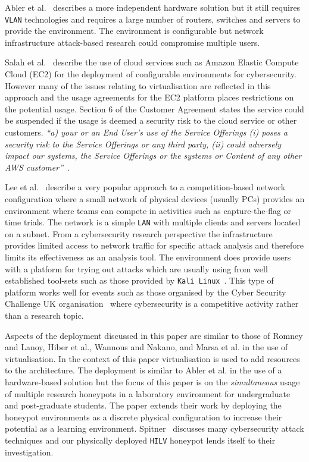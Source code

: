 \documentclass{ieeeaccess}
\begin{document}
Abler et al.~\cite{ACG:06} describes a more independent hardware solution but
it still requires \texttt{VLAN} technologies and requires a large number of
routers, switches and servers to provide the environment. The environment is
configurable but network infrastructure attack-based research could compromise
multiple users.

Salah et al.~\cite{SHZ:15} describe the use of cloud services such as Amazon
Elastic Compute Cloud (EC2) for the deployment of configurable environments for
cybersecurity. However many of the issues relating to virtualisation are
reflected in this approach and the usage agreements for the EC2 platform places
restrictions on the potential usage. Section 6 of the Customer Agreement states
the service could be suspended if the usage is deemed a security risk to the
cloud service or other customers. \textit{``a) your or an End User's use of the
Service Offerings (i) poses a security risk to the Service Offerings or any
third party, (ii) could adversely impact our systems, the Service Offerings or
the systems or Content of any other AWS customer''}~\cite{AWS:18}.

Lee et al.~\cite{LUFC:11} describe a very popular approach to a
competition-based network configuration where a small network of physical
devices (usually PCs) provides an environment where teams can compete in
activities such as capture-the-flag or time trials. The network is a simple
\texttt{LAN} with multiple clients and servers located on a subnet. From a
cybersecurity research perspective the infrastructure provides limited access
to network traffic for specific attack analysis and therefore limits its
effectiveness as an analysis tool. The environment does provide users with a
platform for trying out attacks which are usually using from well established
tool-sets such as those provided by \texttt{Kali Linux}~\cite{OS:17}. This type
of platform works well for events such as those organised by the Cyber Security
Challenge UK organisation~\cite{CSCUK:18} where cybersecurity is a competitive
activity rather than a research topic.   

Aspects of the deployment discussed in this paper are similar to those of
Romney and Lanoy, Hiber et al., Wannous and Nakano, and Marsa et al. in the use
of virtualisation. In the context of this paper virtualisation is used to add
resources to the architecture. The deployment is similar to Abler et al. in the
use of a hardware-based solution but the focus of this paper is on the
\textit{simultaneous} usage of multiple research honeypots in a laboratory
environment for undergraduate and post-graduate students. The paper extends
their work by deploying the honeypot environments as a discrete physical
configuration to increase their potential as a learning environment.
Spitner~\cite{LS:03} discusses many cybersecurity attack techniques and our
physically deployed \texttt{HILV} honeypot lends itself to their investigation. 
\end{document}
